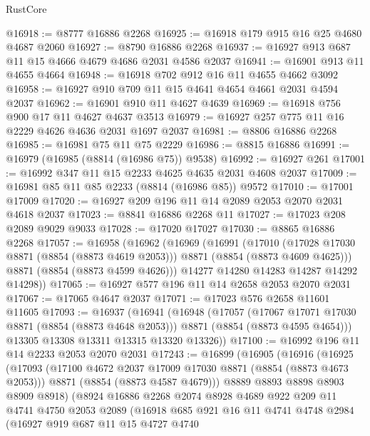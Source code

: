 \begin{lexlean}{RustCore}
\begin{coremodule}
@16918 := @8777 @16886 @2268
@16925 := @16918 @179 @915 @16 @25 @4680 @4687 @2060
@16927 := @8790 @16886 @2268
@16937 := @16927 @913 @687 @11 @15 @4666 @4679 @4686 @2031 @4586 @2037
@16941 := @16901 @913 @11 @4655 @4664
@16948 := @16918 @702 @912 @16 @11 @4655 @4662 @3092
@16958 := @16927 @910 @709 @11 @15 @4641 @4654 @4661 @2031 @4594 @2037
@16962 := @16901 @910 @11 @4627 @4639
@16969 := @16918 @756 @900 @17 @11 @4627 @4637 @3513
@16979 := @16927 @257 @775 @11 @16 @2229 @4626 @4636 @2031 @1697 @2037
@16981 := @8806 @16886 @2268
@16985 := @16981 @75 @11 @75 @2229
@16986 := @8815 @16886
@16991 := @16979 (@16985 (@8814 (@16986 @75)) @9538)
@16992 := @16927 @261
@17001 := @16992 @347 @11 @15 @2233 @4625 @4635 @2031 @4608 @2037
@17009 := @16981 @85 @11 @85 @2233 (@8814 (@16986 @85)) @9572
@17010 := @17001 @17009
@17020 := @16927 @209 @196 @11 @14 @2089 @2053 @2070 @2031 @4618 @2037
@17023 := @8841 @16886 @2268 @11
@17027 := @17023 @208 @2089 @9029 @9033
@17028 := @17020 @17027
@17030 := @8865 @16886 @2268
@17057 := @16958
    (@16962
      (@16969
        (@16991
          (@17010
            (@17028 @17030 @8871 (@8854 (@8873 @4619 @2053)))
            @8871
            (@8854 (@8873 @4609 @4625)))
          @8871
          (@8854 (@8873 @4599 @4626)))
        @14277
        @14280
        @14283
        @14287
        @14292
        @14298))
@17065 := @16927 @577 @196 @11 @14 @2658 @2053 @2070 @2031
@17067 := @17065 @4647 @2037
@17071 := @17023 @576 @2658 @11601 @11605
@17093 := @16937
    (@16941
      (@16948
        (@17057
          (@17067 @17071 @17030 @8871 (@8854 (@8873 @4648 @2053)))
          @8871
          (@8854 (@8873 @4595 @4654)))
        @13305
        @13308
        @13311
        @13315
        @13320
        @13326))
@17100 := @16992 @196 @11 @14 @2233 @2053 @2070 @2031
@17243 := @16899
    (@16905
      (@16916
        (@16925
          (@17093
            (@17100 @4672 @2037 @17009 @17030 @8871 (@8854 (@8873 @4673 @2053)))
            @8871
            (@8854 (@8873 @4587 @4679)))
          @8889
          @8893
          @8898
          @8903
          @8909
          @8918)
        (@8924
          @16886
          @2268
          @2074
          @8928
          @4689
          @922
          @209
          @11
          @4741
          @4750
          @2053
          @2089
          (@16918
            @685
            @921
            @16
            @11
            @4741
            @4748
            @2984
            (@16927
              @919
              @687
              @11
              @15
              @4727
              @4740

\end{coremodule}
\end{lexlean}
